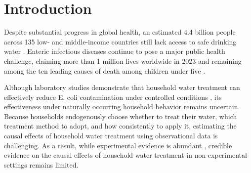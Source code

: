 \documentclass [11pt]{article}
\theoremstyle{plain}
\theoremstyle{definition}
\theoremstyle{remark}
\newcommand{\1}{\bm{1}}
\begin{document}

\clearpage
\section{Introduction} 
Despite substantial progress in global health, an estimated 4.4 billion people across 135 low- and middle-income countries still lack access to safe drinking water \cite{greenwood2024mapping}. Enteric infectious diseases continue to pose a major public health challenge, claiming more than 1 million lives worldwide in 2023 and remaining among the ten leading causes of death among children under five \citep{GBD2023Diarrhoeal2026}.

Although laboratory studies demonstrate that household water treatment can effectively reduce E. coli contamination under controlled conditions \citep{rice1999chlorine}, its effectiveness under naturally occurring household behavior remains uncertain. Because households endogenously choose whether to treat their water, which treatment method to adopt, and how consistently to apply it, estimating the causal effects of household water treatment using observational data is challenging. As a result, while experimental evidence is abundant \citep{arnold2007treating,pickering2019wash,luby2018effects}, credible evidence on the causal effects of household water treatment in non-experimental settings remains limited.
\end{document}
